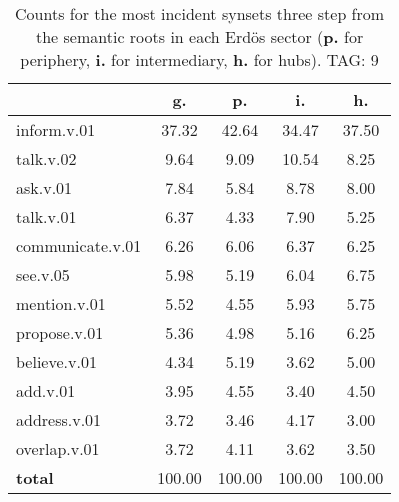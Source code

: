 \begin{table}[h!]
\begin{center}
\begin{tabular}{| l | c | c | c | c |}\hline
 & g. & p. & i. & h. \\\hline
inform.v.01 & 37.32  & 42.64  & 34.47  & 37.50 \\\hline
talk.v.02 & 9.64  & 9.09  & 10.54  & 8.25 \\\hline
ask.v.01 & 7.84  & 5.84  & 8.78  & 8.00 \\\hline
talk.v.01 & 6.37  & 4.33  & 7.90  & 5.25 \\\hline
communicate.v.01 & 6.26  & 6.06  & 6.37  & 6.25 \\\hline
see.v.05 & 5.98  & 5.19  & 6.04  & 6.75 \\\hline
mention.v.01 & 5.52  & 4.55  & 5.93  & 5.75 \\\hline
propose.v.01 & 5.36  & 4.98  & 5.16  & 6.25 \\\hline
believe.v.01 & 4.34  & 5.19  & 3.62  & 5.00 \\\hline
add.v.01 & 3.95  & 4.55  & 3.40  & 4.50 \\\hline
address.v.01 & 3.72  & 3.46  & 4.17  & 3.00 \\\hline
overlap.v.01 & 3.72  & 4.11  & 3.62  & 3.50 \\\hline
{{\bf total}} & 100.00  & 100.00  & 100.00  & 100.00 \\\hline
\end{tabular}
\caption{Counts for the most incident synsets three step from the semantic roots in each Erd\"os sector ({\bf p.} for periphery, {\bf i.} for intermediary, {\bf h.} for hubs). TAG: 9}
\end{center}
\end{table}